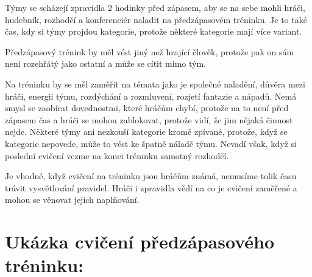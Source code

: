 \documentclass[main.tex]{subfiles}
\begin{document}
\needspace{5cm} \label{předzápasový trénink} Týmy se scházejí zpravidla 2 hodinky před zápasem, aby se na sebe mohli hráči, hudebník, rozhodčí a konferenciér naladit na předzápasovém tréninku. Je to také čas, kdy si týmy projdou kategorie, protože některé kategorie mají více variant. 
 
Předzápasový trénink by měl vést jiný než hrající člověk, protože pak on sám není rozehřátý jako ostatní a může se cítit mimo tým. 
 
Na tréninku by se měl  zaměřit na témata jako je společné naladění, důvěra mezi hráči, energii týmu, rozdýchání a rozmluvení, rozjetí fantazie a nápadů. Nemá smysl se zaobírat dovednostmi, které hráčům chybí, protože na to není před zápasem čas a hráči se mohou zablokovat, protože vidí, že jim nějaká činnost nejde. 
Některé týmy ani nezkouší kategorie kromě zpívané, protože, když se kategorie nepovede, může to vést ke špatně náladě týmu. Nevadí však, když si poslední cvičení vezme na konci tréninku samotný rozhodčí. 
 
Je vhodné, když cvičení na tréninku jsou hráčům známá, nemusíme tolik času trávit vysvětlování pravidel. 
Hráči i zpravidla vědí na co je cvičení zaměřené a mohou se věnovat jejich naplňování. 
 
 
\section{ Ukázka cvičení předzápasového tréninku: }  
 
\end{document}
